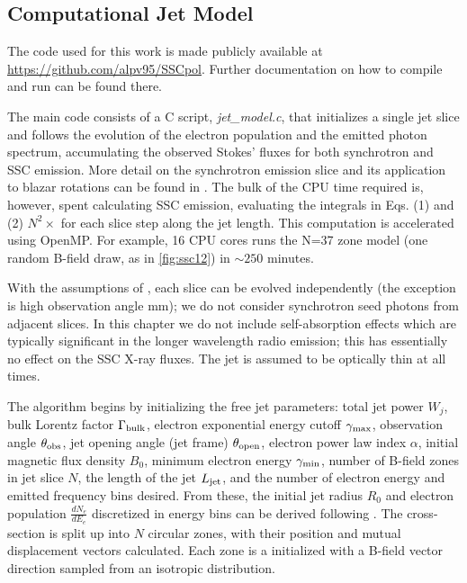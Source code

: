 \subsection{Computational Jet Model}
The code used for this work is made publicly available at \url{https://github.com/alpv95/SSCpol}. Further documentation on how to compile and run can be found there.

The main code consists of a C script, \textit{jet\_model.c}, that initializes a single jet slice and follows the evolution of the electron population and the emitted photon spectrum, accumulating the observed Stokes' fluxes for both synchrotron and SSC emission.  More detail on the synchrotron emission slice and its application to blazar rotations can be found in \citet{peirson_polarization_2018}. The bulk of the CPU time required is, however, spent calculating SSC emission, evaluating the integrals in Eqs. (1) and (2) $N^2 \times$ for each slice step along the jet length. This computation is accelerated using OpenMP. For example, 16 CPU cores runs the N=37 zone model (one random B-field draw, as in \cref{fig:ssc12}) in $\sim 250$ minutes.

With the assumptions of , each slice can be evolved independently (the exception is high observation angle mm); we do not consider synchrotron seed photons from adjacent slices. In this chapter we do not include self-absorption effects which are typically significant in the longer wavelength radio emission; this has essentially no effect on the SSC X-ray fluxes. The jet is assumed to be optically thin at all times.

The algorithm begins by initializing the free jet parameters: total jet power $W_j$, bulk Lorentz factor $\Gamma_{\rm bulk}$, electron exponential energy cutoff $\gamma_{\rm max}$, observation angle $\theta_{\rm obs}$, jet opening angle (jet frame) $\theta_{\rm open}$,
electron power law index $\alpha$, initial magnetic flux density $B_0$, minimum electron energy $\gamma_{\rm min}$, number of B-field zones in jet slice $N$, the length of the jet $L_{\rm jet}$, and the number of electron energy and emitted frequency bins desired. From these, the initial jet radius $R_0$ and electron population $\frac{dN_e}{dE_e}$ discretized in energy bins can be derived following \citet{potter_synchrotron_2012}. The cross-section is split up into $N$ circular zones, with their position and mutual displacement vectors calculated. Each zone is a initialized with a B-field vector direction sampled from an isotropic distribution.

